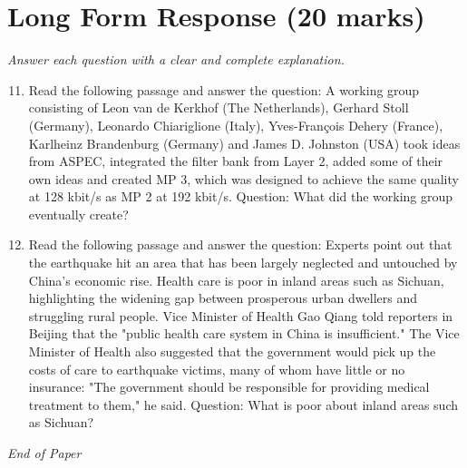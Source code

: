\documentclass[12pt]{article}
\begin{document}
\section*{Long Form Response (20 marks)}
\textit{Answer each question with a clear and complete explanation.}
\begin{enumerate}[label=\arabic*.]
\setcounter{enumi}{10}
\item Read the following passage and answer the question: A working group consisting of Leon van de Kerkhof (The Netherlands), Gerhard Stoll (Germany), Leonardo Chiariglione (Italy), Yves-François Dehery (France), Karlheinz Brandenburg (Germany) and James D. Johnston (USA) took ideas from ASPEC, integrated the filter bank from Layer 2, added some of their own ideas and created MP 3, which was designed to achieve the same quality at 128 kbit/s as MP 2 at 192 kbit/s. Question: What did the working group eventually create?
\item Read the following passage and answer the question: Experts point out that the earthquake hit an area that has been largely neglected and untouched by China's economic rise. Health care is poor in inland areas such as Sichuan, highlighting the widening gap between prosperous urban dwellers and struggling rural people. Vice Minister of Health Gao Qiang told reporters in Beijing that the "public health care system in China is insufficient." The Vice Minister of Health also suggested that the government would pick up the costs of care to earthquake victims, many of whom have little or no insurance: "The government should be responsible for providing medical treatment to them," he said. Question: What is poor about inland areas such as Sichuan?
\end{enumerate}

\vfill
\noindent\textit{End of Paper}
\end{document}
